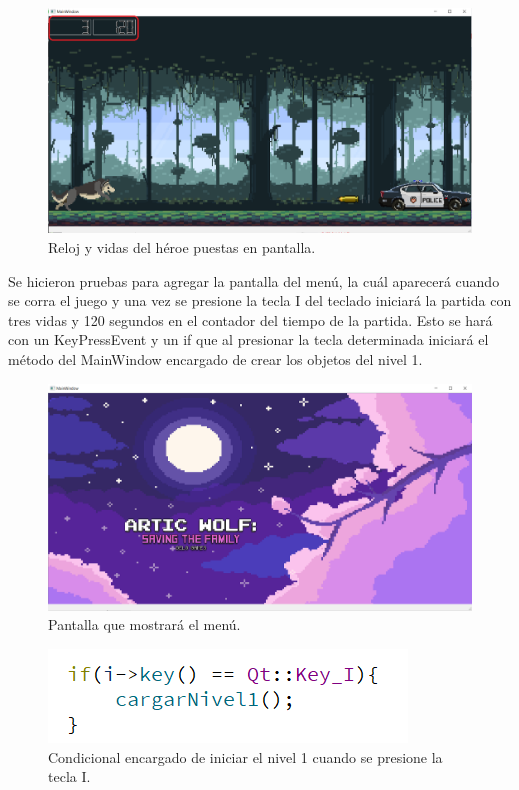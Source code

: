 \documentclass{article}
\begin{document}
\begin{figure}[h]
\includegraphics[scale=0.4]{Images/tiempovidas.png}
\centering
\caption{Reloj y vidas del héroe puestas en pantalla.}
\label{fig:vidastiempo}
\end{figure}

Se hicieron pruebas para agregar la pantalla del menú, la cuál aparecerá cuando se corra el juego y una vez se presione la tecla I del teclado iniciará la partida con tres vidas y 120 segundos en el contador del tiempo de la partida. Esto se hará con un KeyPressEvent y un if que al presionar la tecla determinada iniciará el método del MainWindow encargado de crear los objetos del nivel 1.

\begin{figure}[h]
\includegraphics[scale=0.4]{Images/pantallainicio.png}
\centering
\caption{Pantalla que mostrará el menú.}
\label{fig:pantallamenu}
\end{figure}

\begin{figure}[h]
\includegraphics[scale=1]{Images/keyi.png}
\centering
\caption{Condicional encargado de iniciar el nivel 1 cuando se presione la tecla I.}
\label{fig:if}
\end{figure}
\end{document}
